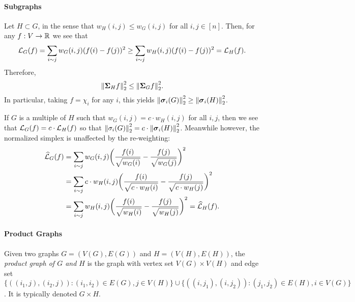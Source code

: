 \paragraph{Subgraphs}
Let $H\subset G$, in the sense that $w_H(i,j)\leq w_G(i,j)$ for all $i,j\in [n]$. Then, for any $f:V\to\mathbb{R}$ we see that 
\[\mathcal{L}_G(f)=\sum_{i\sim j}w_G(i,j)(f(i)-f(j))^2 \geq \sum_{i\sim j}w_H(i,j)(f(i)-f(j))^2 =\mathcal{L}_H(f).\]
Therefore, 
\begin{equation*}
\norm{\boldsymbol{\Sigma}_H f}_2^2 \leq \norm{\boldsymbol{\Sigma}_G f}_2^2. 
\end{equation*}
In particular, taking $f=\chi_i$ for any $i$, this yields $\norm{\vb*{\sigma}_i(G)}_2^2\geq \norm{\vb*{\sigma}_i(H)}_2^2$. 

If $G$ is a multiple of $H$ such that $w_G(i,j)=c\cdot w_H(i,j)$ for all $i,j$, then we see that $\mathcal{L}_G(f)=c\cdot \mathcal{L}_H(f)$ so that $\norm{\sigma_i(G)}_2^2 =c\cdot \norm{\vb*{\sigma}_i(H)}_2^2$. Meanwhile however, the normalized simplex is unaffected by the re-weighting: 
\begin{align*}\widehat{\mathcal{L}}_G(f)&=\sum_{i\sim j}w_G(i,j)\bigg(\frac{f(i)}{\sqrt{w_G(i)}}-\frac{f(j)}{\sqrt{w_G(j)}}\bigg)^2\\
&= \sum_{i\sim j}c\cdot w_H(i,j)\bigg(\frac{f(i)}{\sqrt{c\cdot w_H(i)}}-\frac{f(j)}{\sqrt{c\cdot w_H(j)}}\bigg)^2 \\
&= \sum_{i\sim j} w_H(i,j)\bigg(\frac{f(i)}{\sqrt{ w_H(i)}}-\frac{f(j)}{\sqrt{ w_H(j)}}\bigg)^2 = \widehat{\mathcal{L}}_H(f).
\end{align*}

\paragraph{Product Graphs}

\begin{definition}
	\label{def:product_graphs}
	Given two graphs $G=(V(G),E(G))$ and $H=(V(H), E(H))$, the \emph{product graph of $G$ and $H$} is the graph with vertex set $V(G)\times V(H)$ and edge set
	$\{((i_1,j),(i_2,j)):(i_1,i_2)\in E(G), j\in V(H)\}\cup\{((i,j_1),(i,j_2)):(j_1,j_2)\in E(H), i\in V(G)\}$. It is typically denoted $G\times H$. 
\end{definition} 

